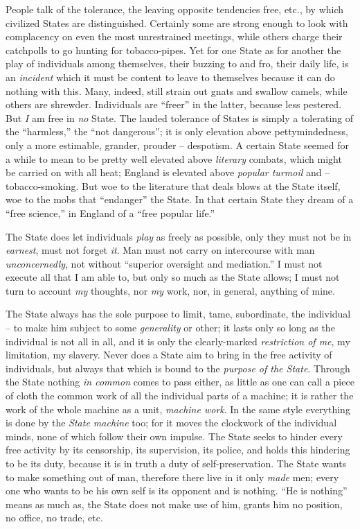 \documentclass[12pt,a4paper]{book}
\begin{document}
People talk of the tolerance, the leaving opposite tendencies free, etc., by 
which civilized States are distinguished. Certainly some are strong enough to 
look with complacency on even the most unrestrained meetings, while others 
charge their catchpolls to go hunting for tobacco-pipes. Yet for one State as 
for another the play of individuals among themselves, their buzzing to and 
fro, their daily life, is an \textit{incident} which it must be content to 
leave to themselves because it can do nothing with this. Many, indeed, still 
strain out gnats and swallow camels, while others are shrewder. Individuals 
are ``freer'' in the latter, because less pestered. But \textit{I} am free 
in \textit{no} State. The lauded tolerance of States is simply a tolerating of 
the ``harmless,'' the ``not dangerous''; it is only elevation above 
pettymindedness, only a more estimable, grander, prouder -- despotism. A 
certain State seemed for a while to mean to be pretty well elevated above 
\textit{literary} combats, which might be carried on with all heat; England is 
elevated above \textit{popular turmoil} and -- tobacco-smoking. But woe to the 
literature that deals blows at the State itself, woe to the mobs that 
``endanger'' the State. In that certain State they dream of a ``free 
science,'' in England of a ``free popular life.''

The State does let individuals \textit{play} as freely as possible, only they 
must not be in \textit{earnest}, must not forget \textit{it}. Man must not 
carry on intercourse with man \textit{unconcernedly}, not without ``superior 
oversight and mediation.'' I must not execute all that I am able to, but only 
so much as the State allows; I must not turn to account \textit{my} thoughts, 
nor \textit{my} work, nor, in general, anything of mine.

The State always has the sole purpose to limit, tame, subordinate, the 
individual -- to make him subject to some \textit{generality} or other; it 
lasts only so long as the individual is not all in all, and it is only the 
clearly-marked \textit{restriction of me}, my limitation, my slavery. Never 
does a State aim to bring in the free activity of individuals, but always that 
which is bound to the \textit{purpose of the State}. Through the State nothing 
\textit{in common} comes to pass either, as little as one can call a piece of 
cloth the common work of all the individual parts of a machine; it is rather 
the work of the whole machine as a unit, \textit{machine work}. In the same 
style everything is done by the \textit{State machine} too; for it moves the 
clockwork of the individual minds, none of which follow their own impulse. The 
State seeks to hinder every free activity by its censorship, its supervision, 
its police, and holds this hindering to be its duty, because it is in truth a 
duty of self-preservation. The State wants to make something out of man, 
therefore there live in it only \textit{made} men; every one who wants to be 
his own self is its opponent and is nothing. ``He is nothing'' means as much 
as, the State does not make use of him, grants him no position, no office, no 
trade, etc.
\end{document}
